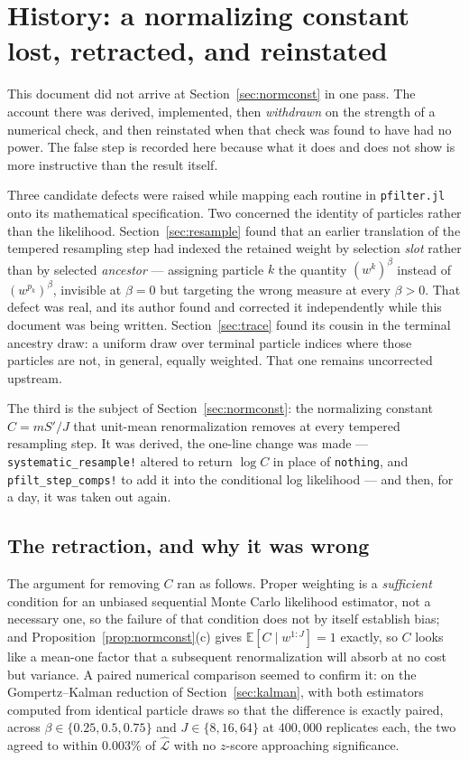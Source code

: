 \documentclass[11pt]{article}
\newcommand{\E}{\mathbb{E}}
\begin{document}
\section{History: a normalizing constant lost, retracted, and reinstated}
\label{sec:history}

This document did not arrive at Section~\ref{sec:normconst} in one pass. The
account there was derived, implemented, then \emph{withdrawn} on the
strength of a numerical check, and then reinstated when that check was
found to have had no power. The false step is recorded here because what
it does and does not show is more instructive than the result itself.

Three candidate defects were raised while mapping each routine in
\texttt{pfilter.jl} onto its mathematical specification. Two concerned the
identity of particles rather than the likelihood.
Section~\ref{sec:resample} found that an earlier translation of the
tempered resampling step had indexed the retained weight by selection
\emph{slot} rather than by selected \emph{ancestor} --- assigning particle
$k$ the quantity $(w^k)^\beta$ instead of $(w^{p_k})^\beta$, invisible at
$\beta=0$ but targeting the wrong measure at every $\beta>0$. That defect
was real, and its author found and corrected it independently while this
document was being written. Section~\ref{sec:trace} found its cousin in
the terminal ancestry draw: a uniform draw over terminal particle indices
where those particles are not, in general, equally weighted. That one
remains uncorrected upstream.

The third is the subject of Section~\ref{sec:normconst}: the normalizing
constant $C=mS'/J$ that unit-mean renormalization removes at every
tempered resampling step. It was derived, the one-line change was made ---
\texttt{systematic\_resample!} altered to return $\log C$ in place of
\texttt{nothing}, and \texttt{pfilt\_step\_comps!} to add it into the
conditional log likelihood --- and then, for a day, it was taken out
again.

\subsection{The retraction, and why it was wrong}

The argument for removing $C$ ran as follows. Proper weighting is a
\emph{sufficient} condition for an unbiased sequential Monte Carlo
likelihood estimator, not a necessary one, so the failure of that
condition does not by itself establish bias; and
Proposition~\ref{prop:normconst}(c) gives $\E[C\mid w^{1:J}]=1$ exactly, so
$C$ looks like a mean-one factor that a subsequent renormalization will
absorb at no cost but variance. A paired numerical comparison seemed to
confirm it: on the Gompertz--Kalman reduction of
Section~\ref{sec:kalman}, with both estimators computed from identical
particle draws so that the difference is exactly paired, across
$\beta\in\{0.25,0.5,0.75\}$ and $J\in\{8,16,64\}$ at $400{,}000$
replicates each, the two agreed to within $0.003\%$ of
$\widehat{\mathcal L}$ with no $z$-score approaching significance.
\end{document}
